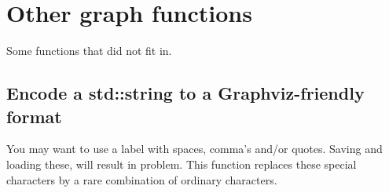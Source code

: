 \chapter{Other graph functions}
\label{sec:Other-graph-functions}

Some functions that did not fit in.

\section{Encode a std::string to a Graphviz-friendly format}
\label{subsec:graphviz_encode}

You may want to use a label with spaces, comma's and/or quotes.
Saving and loading these, will result in problem.
This function replaces these special characters by a rare combination of
ordinary characters.



